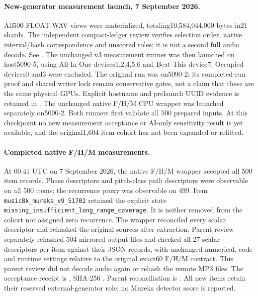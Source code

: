 \paragraph{New-generator measurement launch, 7 September 2026.}
All500 FLOAT-WAV views were materialized, totaling10,584,044,000 bytes in21
shards. The independent compact-ledger review verifies selection order, native
interval/hash correspondence and unscored roles; it is not a second full audio
decode. See .
The unchanged v3 measurement runner was then launched on host5090-5, using
All-In-One devices1,2,4,5,6 and Beat This device7. Occupied devices0 and3 were
excluded. The original run was on5090-2: its completed-run proof and shared
writer lock remain conservative gates, not a claim that these are the same
physical GPUs. Explicit hostname and prelaunch UUID evidence is retained in
. The unchanged native F/H/M
CPU wrapper was launched separately on5090-2. Both runners first validate all
500 prepared inputs. At this checkpoint no new measurement acceptance or
AI-only sensitivity result is yet available, and the original1,604-item cohort
has not been expanded or refitted.

\paragraph{Completed native F/H/M measurements.}
At 00:41 UTC on 7 September 2026, the native F/H/M wrapper accepted all
500 item records. Phase descriptors and pitch-class path descriptors were
observable on all 500 items; the recurrence proxy was observable on 499.
Item \texttt{music8k\_mureka\_v9\_51702} retained the explicit state
\texttt{missing\_insufficient\_long\_range\_coverage}. It is neither removed
from the cohort nor assigned zero recurrence. The wrapper reconciled every
scalar descriptor and rehashed the original sources after extraction. Parent
review separately rehashed 504 mirrored output files and checked all 27 scalar
descriptors per item against their JSON records, with unchanged numerical,
code and runtime settings relative to the original exact60 F/H/M contract.
This parent review did not decode audio again or rehash the remote MP3 files.
The acceptance receipt is
, SHA-256
.
Parent reconciliation is
. All new items retain
their reserved external-generator role; no Mureka detector score is reported.

